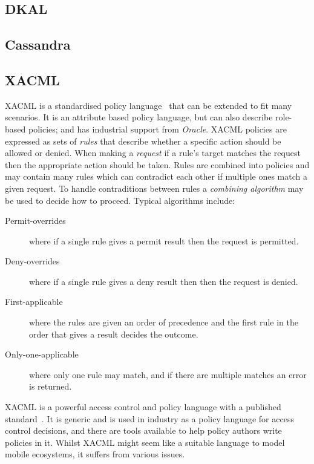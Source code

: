 \documentclass[thesis.tex]{subfiles}
\begin{document}
\subsection{DKAL}
\subsection{Cassandra}
\subsection{XACML}

XACML is a standardised policy language~\cite{oasis_extensible_2013} that can be
extended to fit many scenarios. It is an attribute based policy language, but
can also describe role-based policies; and has industrial support from
\emph{Oracle}. XACML policies are expressed as sets of \emph{rules} that
describe whether a specific action should be allowed or denied. When making a
\emph{request} if a rule's target matches the request then the appropriate
action should be taken. Rules are combined into policies and may contain many
rules which can contradict each other if multiple ones match a given request. To
handle contraditions between rules a \emph{combining algorithm} may be used to
decide how to proceed. Typical algorithms include:

\begin{description}
  \item[Permit-overrides] where if a single rule gives a permit result then the request is permitted.
  \item[Deny-overrides] where if a single rule gives a deny result then then the request is denied.
  \item[First-applicable] where the rules are given an order of precedence and the first rule in the order that gives a result decides the outcome.
  \item[Only-one-applicable] where only one rule may match, and if there are multiple matches an error is returned.
\end{description}

XACML is a powerful access control and policy language with a published
standard~\cite{oasis_extensible_2013}. It is generic and is used in industry as
a policy language for access control decisions, and there are tools available to
help policy authors write policies in it. Whilst XACML might seem like a
suitable language to model mobile ecosystems, it suffers from various issues.
\end{document}
